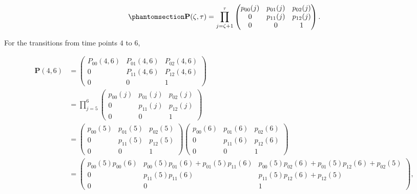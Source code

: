 \documentclass[
  letterpaper,
  krantz2]{style/krantz}
\begin{document}
\begin{equation}\phantomsection\label{eq-ms-trans-prob-ill-death-discrete}{
\mathbf{P}(\zeta, \tau) = \prod_{j =\zeta+1}^{\tau}
\begin{pmatrix}
  p_{00}(j) & p_{01}(j) & p_{02}(j)\\
  0 & p_{11}(j) & p_{12}(j)\\
  0 & 0 & 1\\
  \end{pmatrix}.
}\end{equation}

For the transitions from time points \(4\) to \(6\),

\[
\begin{aligned}
\mathbf{P}(4, 6) &=
\begin{pmatrix}
P_{00}(4, 6) & P_{01}(4, 6) & P_{02}(4, 6)\\
        0 & P_{11}(4, 6) & P_{12}(4,6)\\
        0 &         0 &         1
\end{pmatrix} \\
&= \prod_{j=5}^6
\begin{pmatrix}
p_{00}(j) & p_{01}(j) & p_{02}(j)\\
        0 & p_{11}(j) & p_{12}(j)\\
        0 &         0 &         1
\end{pmatrix}\\
            & =
\begin{pmatrix}
p_{00}(5) & p_{01}(5) & p_{02}(5)\\
        0 & p_{11}(5) & p_{12}(5)\\
        0 &         0 &         1
\end{pmatrix}
\begin{pmatrix}
p_{00}(6) & p_{01}(6) & p_{02}(6)\\
        0 & p_{11}(6) & p_{12}(6)\\
        0 &         0 &         1
\end{pmatrix}\\
            &=
\begin{pmatrix}
p_{00}(5) p_{00}(6) & p_{00}(5)p_{01}(6) + p_{01}(5)p_{11}(6) & p_{00}(5)p_{02}(6) + p_{01}(5)p_{12}(6) + p_{02}(5)\\
        0           & p_{11}(5) p_{11}(6)& p_{11}(5)p_{12}(6) + p_{12}(5)\\
        0           &                  0 &         1
\end{pmatrix},
\end{aligned}
\]
\end{document}
